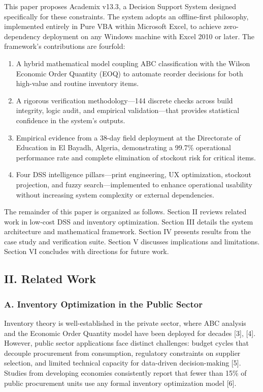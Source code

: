 ﻿\documentclass[conference]{IEEEtran}
\begin{document}
This paper proposes Academix v13.3, a Decision Support System designed
specifically for these constraints. The system adopts an offline-first
philosophy, implemented entirely in Pure VBA within Microsoft Excel, to
achieve zero-dependency deployment on any Windows machine with Excel
2010 or later. The framework's contributions are fourfold:

\begin{enumerate}
\def\labelenumi{\arabic{enumi}.}
\tightlist
\item
  A hybrid mathematical model coupling ABC classification with the
  Wilson Economic Order Quantity (EOQ) to automate reorder decisions for
  both high-value and routine inventory items.
\item
  A rigorous verification methodology---144 discrete checks across build
  integrity, logic audit, and empirical validation---that provides
  statistical confidence in the system's outputs.
\item
  Empirical evidence from a 38-day field deployment at the Directorate
  of Education in El Bayadh, Algeria, demonstrating a 99.7\% operational
  performance rate and complete elimination of stockout risk for
  critical items.
\item
  Four DSS intelligence pillars---print engineering, UX optimization,
  stockout projection, and fuzzy search---implemented to enhance
  operational usability without increasing system complexity or external
  dependencies.
\end{enumerate}

The remainder of this paper is organized as follows. Section II reviews
related work in low-cost DSS and inventory optimization. Section III
details the system architecture and mathematical framework. Section IV
presents results from the case study and verification suite. Section V
discusses implications and limitations. Section VI concludes with
directions for future work.

\subsection{II. Related Work}\label{ii.-related-work}

\subsubsection{A. Inventory Optimization in the Public
Sector}\label{a.-inventory-optimization-in-the-public-sector}

Inventory theory is well-established in the private sector, where ABC
analysis and the Economic Order Quantity model have been deployed for
decades {[}3{]}, {[}4{]}. However, public sector applications face
distinct challenges: budget cycles that decouple procurement from
consumption, regulatory constraints on supplier selection, and limited
technical capacity for data-driven decision-making {[}5{]}. Studies from
developing economies consistently report that fewer than 15\% of public
procurement units use any formal inventory optimization model {[}6{]}.
\end{document}
